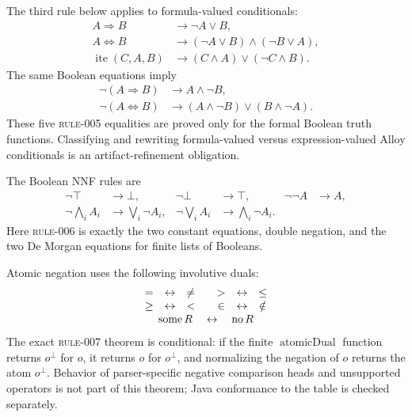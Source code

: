 The third rule below applies to formula-valued conditionals:
\begin{align*}
 A\Rightarrow B
   &\longrightarrow \neg A\lor B,\\
 A\Leftrightarrow B
   &\longrightarrow (\neg A\lor B)\land(\neg B\lor A),\\
 \operatorname{ite}(C,A,B)
   &\longrightarrow (C\land A)\lor(\neg C\land B).
\end{align*}
The same Boolean equations imply
\begin{align*}
 \neg(A\Rightarrow B)&\longrightarrow A\land\neg B,\\
 \neg(A\Leftrightarrow B)&\longrightarrow
   (A\land\neg B)\lor(B\land\neg A).
\end{align*}
These five \textsc{rule-005} equalities are proved only for the formal Boolean
truth functions.  Classifying and rewriting formula-valued versus
expression-valued Alloy conditionals is an artifact-refinement obligation.

The Boolean NNF rules are
\begin{align*}
 \neg\top&\longrightarrow\bot,&
 \neg\bot&\longrightarrow\top,&
 \neg\neg A&\longrightarrow A,\\
 \neg\bigwedge_i A_i&\longrightarrow\bigvee_i\neg A_i,&
 \neg\bigvee_i A_i&\longrightarrow\bigwedge_i\neg A_i.
\end{align*}
Here \textsc{rule-006} is exactly the two constant equations, double negation,
and the two De Morgan equations for finite lists of Booleans.

Atomic negation uses the following involutive duals:
\[
\begin{array}{c@{\quad\leftrightarrow\quad}c@{\qquad}c@{\quad\leftrightarrow\quad}c}
 = & \ne & > & \le \\
 \ge & < & \in & \notin \\
 \multicolumn{4}{c}{\operatorname{some}R\quad\leftrightarrow\quad\operatorname{no}R}
\end{array}
\]
The exact \textsc{rule-007} theorem is conditional: if the finite
$\operatorname{atomicDual}$ function returns $o^\bot$ for $o$, it returns $o$
for $o^\bot$, and normalizing the negation of $o$ returns the atom
$o^\bot$.  Behavior of parser-specific negative comparison heads and
unsupported operators is not part of this theorem; Java conformance to the
table is checked separately.

